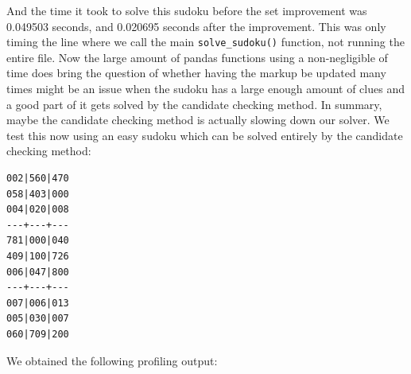 \documentclass[12pt]{report} %
\begin{document}
And the time it took to solve this sudoku before the set improvement was 0.049503 seconds, and 0.020695 seconds after the improvement. This was only timing the line where we call the main \texttt{solve\_sudoku()} function, not running the entire file. Now the large amount of pandas functions using a non-negligible of time does bring the question of whether having the markup be updated many times might be an issue when the sudoku has a large enough amount of clues and a good part of it gets solved by the candidate checking method. In summary, maybe the candidate checking method is actually slowing down our solver. We test this now using an easy sudoku which can be solved entirely by the candidate checking method:

\begin{lstlisting}[caption= {sudoku\_easy.txt}]
002|560|470
058|403|000
004|020|008
---+---+---
781|000|040
409|100|726
006|047|800
---+---+---
007|006|013
005|030|007
060|709|200
\end{lstlisting}


We obtained the following profiling output:
\end{document}
